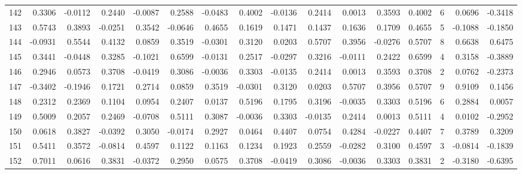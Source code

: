 \begin{tabular}{lrrrrrrrrrrrrrrr}
142 &      0.3306 & -0.0112 &  0.2440 & -0.0087 &  0.2588 & -0.0483 &  0.4002 & -0.0136 &  0.2414 &  0.0013 &   0.3593 &     0.4002 &      6 &                    0.0696 &                    -0.3418 \\
143 &      0.5743 &  0.3893 & -0.0251 &  0.3542 & -0.0646 &  0.4655 &  0.1619 &  0.1471 &  0.1437 &  0.1636 &   0.1709 &     0.4655 &      5 &                   -0.1088 &                    -0.1850 \\
144 &     -0.0931 &  0.5544 &  0.4132 &  0.0859 &  0.3519 & -0.0301 &  0.3120 &  0.0203 &  0.5707 &  0.3956 &  -0.0276 &     0.5707 &      8 &                    0.6638 &                     0.6475 \\
145 &      0.3441 & -0.0448 &  0.3285 & -0.1021 &  0.6599 & -0.0131 &  0.2517 & -0.0297 &  0.3216 & -0.0111 &   0.2422 &     0.6599 &      4 &                    0.3158 &                    -0.3889 \\
146 &      0.2946 &  0.0573 &  0.3708 & -0.0419 &  0.3086 & -0.0036 &  0.3303 & -0.0135 &  0.2414 &  0.0013 &   0.3593 &     0.3708 &      2 &                    0.0762 &                    -0.2373 \\
147 &     -0.3402 & -0.1946 &  0.1721 &  0.2714 &  0.0859 &  0.3519 & -0.0301 &  0.3120 &  0.0203 &  0.5707 &   0.3956 &     0.5707 &      9 &                    0.9109 &                     0.1456 \\
148 &      0.2312 &  0.2369 &  0.1104 &  0.0954 &  0.2407 &  0.0137 &  0.5196 &  0.1795 &  0.3196 & -0.0035 &   0.3303 &     0.5196 &      6 &                    0.2884 &                     0.0057 \\
149 &      0.5009 &  0.2057 &  0.2469 & -0.0708 &  0.5111 &  0.3087 & -0.0036 &  0.3303 & -0.0135 &  0.2414 &   0.0013 &     0.5111 &      4 &                    0.0102 &                    -0.2952 \\
150 &      0.0618 &  0.3827 & -0.0392 &  0.3050 & -0.0174 &  0.2927 &  0.0464 &  0.4407 &  0.0754 &  0.4284 &  -0.0227 &     0.4407 &      7 &                    0.3789 &                     0.3209 \\
151 &      0.5411 &  0.3572 & -0.0814 &  0.4597 &  0.1122 &  0.1163 &  0.1234 &  0.1923 &  0.2559 & -0.0282 &   0.3100 &     0.4597 &      3 &                   -0.0814 &                    -0.1839 \\
152 &      0.7011 &  0.0616 &  0.3831 & -0.0372 &  0.2950 &  0.0575 &  0.3708 & -0.0419 &  0.3086 & -0.0036 &   0.3303 &     0.3831 &      2 &                   -0.3180 &                    -0.6395 \\

\end{tabular}
